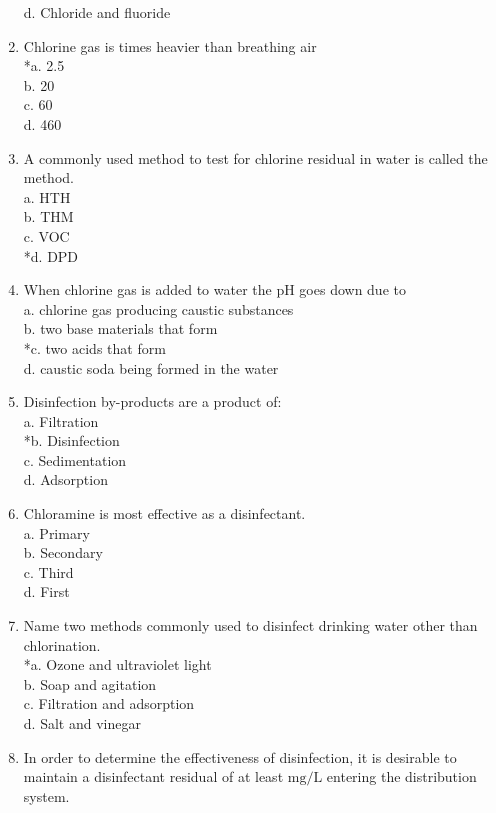 \begin{enumerate}[1.]
d. Chloride and fluoride\\
\item Chlorine gas is times heavier than breathing air\\
*a. 2.5\\
b. 20\\
c. 60\\
d. 460\\
\item A commonly used method to test for chlorine residual in water is called the method.\\
a. HTH\\
b. THM\\
c. VOC\\
*d. DPD\\
\item When chlorine gas is added to water the pH goes down due to\\
a. chlorine gas producing caustic substances\\
b. two base materials that form\\
*c. two acids that form\\
d. caustic soda being formed in the water\\
\item Disinfection by-products are a product of:\\
a. Filtration\\
*b. Disinfection\\
c. Sedimentation\\
d. Adsorption\\
\item Chloramine is most effective as a disinfectant.\\
a. Primary\\
b. Secondary\\
c. Third\\
d. First\\
\item Name two methods commonly used to disinfect drinking water other than chlorination.\\
*a. Ozone and ultraviolet light\\
b. Soap and agitation\\
c. Filtration and adsorption\\
d. Salt and vinegar\\
\item In order to determine the effectiveness of disinfection, it is desirable to maintain a disinfectant residual of at least $\mathrm{mg} / \mathrm{L}$ entering the distribution system.\\

\end{enumerate}

